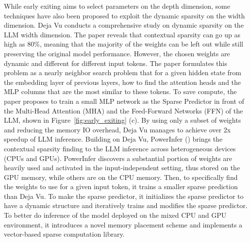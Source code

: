 While early exiting aims to select parameters on the depth dimension, some techniques have also been proposed to exploit the dynamic sparsity on the width dimension. Deja Vu \cite{liu2023deja} conducts a comprehensive study on dynamic sparsity on the LLM width dimension. The paper reveals that contextual sparsity can go up as high as 80\%, meaning that the majority of the weights can be left out while still preserving the original model performance. However, the chosen weights are dynamic and different for different input tokens. The paper formulates this problem as a nearly neighbor search problem that for a given hidden state from the embedding layer of previous layers, how to find the attention heads and the MLP columns that are the most similar to these tokens. To save compute, the paper proposes to train a small MLP network as the Sparse Predictor in front of the Multi-Head Attention (MHA) and the Feed-Forward Networks (FFN) of the LLM, shown in Figure~\ref{fig:early_exiting} (c). By using only a subset of weights and reducing the memory IO overhead, Deja Vu manages to achieve over 2x speedup of LLM inference. Building on Deja Vu, PowerInfer (\cite{song2023powerinfer}) brings the contextual sparsity finding to the LLM inference across heterogeneous devices (CPUs and GPUs). PowerInfer discovers a substantial portion of weights are heavily used and activated in the input-independent setting, thus stored on the GPU memory, while others are on the CPU memory. 
Then, to specifically find the weights to use for a given input token, it trains a smaller sparse prediction than Deja Vu. To make the sparse predictor, it initializes the sparse predictor to have a dynamic structure and iteratively trains and modifies the sparse predictor. 
To better do inference of the model deployed on the mixed CPU and GPU environment, it introduces a novel memory placement scheme and implements a vector-based sparse computation library. 
